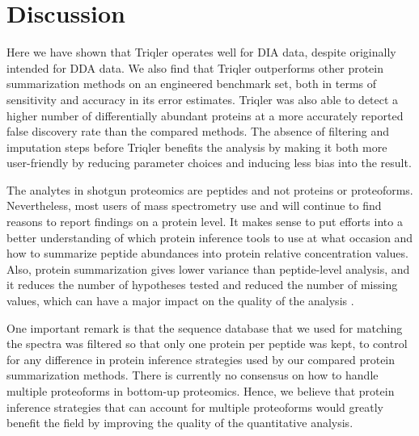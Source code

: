 \documentclass[10pt,letterpaper]{article}
\begin{document}





\section*{Discussion}

Here we have shown that Triqler operates well for DIA data, despite originally intended for DDA data. We also find that Triqler outperforms other protein summarization methods on an engineered benchmark set, both in terms of sensitivity and accuracy in its error estimates. Triqler was also able to detect a higher number of differentially abundant proteins at a more accurately reported false discovery rate than the compared methods. The absence of filtering and imputation steps before Triqler benefits the analysis by making it both more user-friendly by reducing parameter choices and inducing less bias into the result. 

The analytes in shotgun proteomics are peptides and not proteins or proteoforms. Nevertheless, most users of mass spectrometry use and will continue to find reasons to report findings on a protein level. It makes sense to put efforts into a better understanding of which protein inference tools to use at what occasion and how to summarize peptide abundances into protein relative concentration values. Also, protein summarization gives lower variance than peptide-level analysis, and it reduces the number of hypotheses tested and reduced the number of missing values, which can have a major impact on the quality of the analysis \cite{plubell2021can}.   

One important remark is that the sequence database that we used for matching the spectra was filtered so that only one protein per peptide was kept, to control for any difference in protein inference strategies used by our compared protein summarization methods. There is currently no consensus on how to handle multiple proteoforms in bottom-up proteomics. Hence, we believe that protein inference strategies that can account for multiple proteoforms would greatly benefit the field by improving the quality of the quantitative analysis. 
\end{document}
